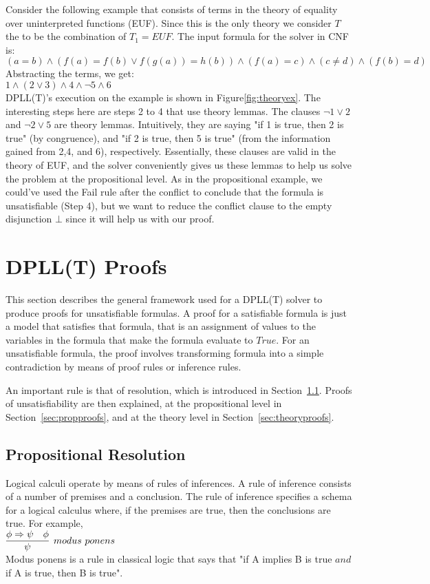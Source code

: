 \documentclass{article}
\begin{document}
Consider the following example that consists of terms 
in the theory of equality over uninterpreted 
functions (EUF). Since this is the only theory we consider 
$T$ the to be the combination of $T_1 = EUF$.
The input formula for the solver 
in CNF is: \\
$(a = b) \land (f(a) = f(b) \lor f(g(a)) = h(b)) \land
(f(a) = c) \land (c \neq d) \land (f(b) = d)$ \\
Abstracting the terms, we get: \\
$1 \land (2 \lor 3) \land 4 \land \neg 5 \land 6$ \\
DPLL(T)'s execution on the example is shown in 
Figure\ref{fig:theoryex}. The interesting steps here 
are steps 2 to 4 that use theory lemmas. The clauses 
$\neg 1 \lor 2$ and $\neg 2 \lor 5$ are theory lemmas.
Intuitively, they are saying "if 1 is true, then 2 is 
true" (by congruence), and "if 2 is true, then 5 is true"
(from the information gained from 2,4, and 6), respectively. 
Essentially, these clauses are valid in the theory of 
EUF, and the solver conveniently gives us these lemmas 
to help us solve the problem at the propositional level.
As in the propositional example, we could've used 
the Fail rule after the conflict to conclude that 
the formula is unsatisfiable (Step 4), but we want 
to reduce the conflict clause to the empty disjunction
$\bot$ since it will help us with our proof.


\section{DPLL(T) Proofs}
\label{sec:proofs}
This section describes the general framework used for a 
DPLL(T) solver to produce proofs for unsatisfiable formulas. 
A proof for a satisfiable formula is just a model that 
satisfies that formula, that is an assignment of values to 
the variables in the formula that make the formula evaluate 
to $True$. For an unsatisfiable formula, the proof involves 
transforming formula into a simple contradiction by means 
of proof rules or inference rules. 

An important rule is that of resolution, which is introduced 
in Section~\ref{sec:res}. Proofs of unsatisfiability are then 
explained, at the propositional level in 
Section~\ref{sec:propproofs}, and at the theory level in 
Section~\ref{sec:theoryproofs}.

\subsection{Propositional Resolution}
\label{sec:res}
Logical calculi operate by means of rules of inferences. A
rule of inference consists of a number of premises and a 
conclusion. The rule of inference specifies a schema for a 
logical calculus where, if the premises are true, then 
the conclusions are true. For example, \\
$\infer[modus\ ponens]{\psi}{\phi \Rightarrow \psi & \phi}$ \\
Modus ponens is a rule in classical logic that says that 
"if A implies B is true $and$ if A is true, then B is true".
\end{document}
